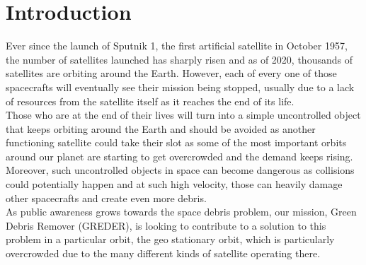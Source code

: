 \chapter{Introduction}
\qquad Ever since the launch of Sputnik 1, the first artificial satellite in October 1957, the number of satellites launched has sharply risen and as of 2020, thousands of satellites are orbiting around the Earth. However, each of every one of those spacecrafts will eventually see their mission being stopped, usually due to a lack of resources from the satellite itself as it reaches the end of its life. \\

Those who are at the end of their lives will turn into a simple uncontrolled object that keeps orbiting around the Earth and should be avoided as another functioning satellite could take their slot as some of the most important orbits around our planet are starting to get overcrowded and the demand keeps rising.\\

Moreover, such uncontrolled objects in space can become dangerous as collisions could potentially happen and at such high velocity, those can heavily damage other spacecrafts and create even more debris.\\

As public awareness grows towards the space debris problem, our mission, Green Debris Remover (GREDER), is looking to contribute to a solution to this problem in a particular orbit, the geo stationary orbit, which is particularly overcrowded due to the many different kinds of satellite operating there.